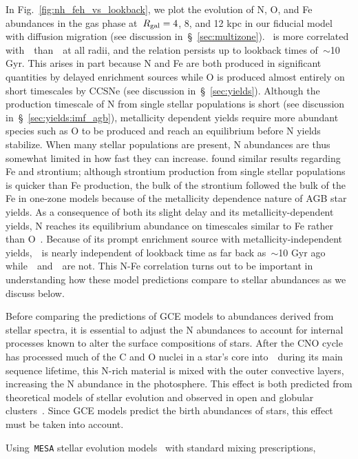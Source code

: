 \documentclass[ms.tex]{subfiles}
\begin{document}
In Fig.~\ref{fig:nh_feh_vs_lookback}, we plot the evolution of N, O, and Fe
abundances in the gas phase at~$R_\text{gal} = 4$, 8, and 12 kpc in our fiducial model
with diffusion migration (see discussion in~\S~\ref{sec:multizone}).
\nh~is more correlated with~\feh~than~\oh~at all radii, and the relation
persists up to lookback times of~$\sim$10 Gyr.
This arises in part because N and Fe are both produced in significant
quantities by delayed enrichment sources while O is produced almost entirely on
short timescales by CCSNe (see discussion in~\S~\ref{sec:yields}).
Although the production timescale of N from single stellar populations is
short (see discussion in~\S~\ref{sec:yields:imf_agb}), metallicity dependent
yields require more abundant species such as O to be produced and reach an
equilibrium before N yields stabilize.
When many stellar populations are present, N abundances are thus somewhat
limited in how fast they can increase.
\citet{Johnson2020} found similar results regarding Fe and strontium; although
strontium production from single stellar populations is quicker than Fe
production, the bulk of the strontium followed the bulk of the Fe in one-zone
models because of the metallicity dependence nature of AGB star yields.
As a consequence of both its slight delay and its metallicity-dependent
yields, N reaches its equilibrium abundance on timescales similar to Fe rather
than O~\citep{Weinberg2017}.
Because of its prompt enrichment source with metallicity-independent
yields,~\oh~is nearly independent of lookback time as far back as~$\sim$10 Gyr
ago while~\nh~and~\feh~are not.
This N-Fe correlation turns out to be important in understanding how these
model predictions compare to stellar abundances as we discuss below.
\par
Before comparing the predictions of GCE models to abundances derived from
stellar spectra, it is essential to adjust the N abundances to account for
internal processes known to alter the surface compositions of stars.
After the CNO cycle has processed much of the C and O nuclei in a star's core
into~\Nfourteen~during its main sequence lifetime, this N-rich material is
mixed with the outer convective layers, increasing the N abundance in the
photosphere.
This effect is both predicted from theoretical models of stellar evolution and
observed in open and globular clusters~\citep{Gilroy1989, Korn2007, Lind2008,
Souto2018, Souto2019}.
Since GCE models predict the birth abundances of stars, this effect must be
taken into account.
\par
Using~\texttt{MESA} stellar evolution models~\citep{Paxton2011, Paxton2013,
Paxton2015, Paxton2018} with standard mixing prescriptions,~\citet{Vincenzo2021}
\end{document}
